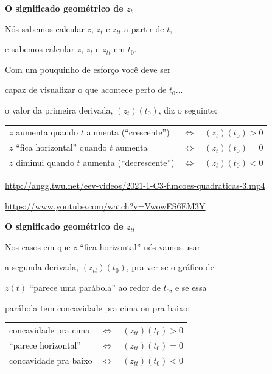 \documentclass[oneside,12pt]{article}
\begin{document}
{\bf O significado geométrico de $z_t$}

Nós sabemos calcular $z$, $z_t$ e $z_{tt}$ a partir de $t$,

e sabemos calcular $z$, $z_t$ e $z_{tt}$ em $t_0$.

\ssk

Com um pouquinho de esforço você deve ser

capaz de visualizar o que acontece perto de $t_0$...

o valor da primeira derivada, $(z_t)(t_0)$, diz o seguinte:

\def\LR{$\Longleftrightarrow$}

\msk

\begin{tabular}{lll}
$z$ aumenta quando $t$ aumenta (``crescente'')   &\LR& $(z_t)(t_0)>0$ \\
$z$ ``fica horizontal'' quando $t$ aumenta       &\LR& $(z_t)(t_0)=0$ \\
$z$ diminui quando $t$ aumenta (``decrescente'') &\LR& $(z_t)(t_0)<0$ \\
\end{tabular}

\bsk
\bsk


\ssk

{\footnotesize


\url{http://angg.twu.net/eev-videos/2021-1-C3-funcoes-quadraticas-3.mp4}

\url{https://www.youtube.com/watch?v=VwowES6EM3Y}

}

\newpage


{\bf O significado geométrico de $z_{tt}$}

Nos casos em que $z$ ``fica horizontal'' nós vamos usar

a segunda derivada, $(z_{tt})(t_0)$, pra ver se o gráfico de

$z(t)$ ``parece uma parábola'' ao redor de $t_0$, e se essa

parábola tem concavidade pra cima ou pra baixo:

\msk

\begin{tabular}{lll}
concavidade pra cima  &\LR& $(z_{tt})(t_0)>0$ \\
``parece horizontal'' &\LR& $(z_{tt})(t_0)=0$ \\
concavidade pra baixo &\LR& $(z_{tt})(t_0)<0$ \\
\end{tabular}
\end{document}
